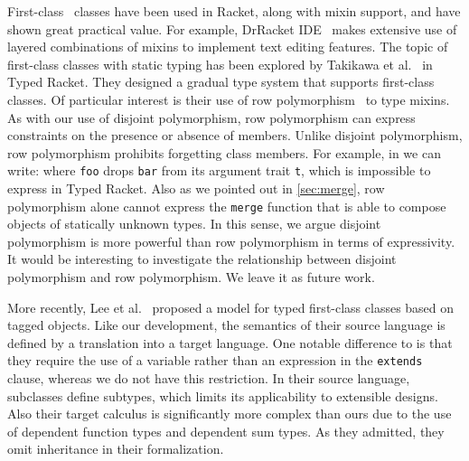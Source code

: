First-class~\citep{DBLP:conf/aplas/FlattFF06} classes have been used in
Racket, along with mixin support, and
have shown great practical value. For example, DrRacket
IDE~\citep{DBLP:journals/jfp/FindlerCFFKSF02} makes extensive use of layered
combinations of mixins to implement text editing features. The topic of
first-class classes with static typing has been explored by Takikawa et
al.~\citep{DBLP:conf/oopsla/TakikawaSDTF12} in Typed Racket. They designed a
gradual type system that supports first-class classes. Of particular interest is
their use of row polymorphism~\citep{wand1994type} to type mixins.
As with our use of disjoint polymorphism, row polymorphism can express
constraints on the presence or absence of members. Unlike disjoint polymorphism,
row polymorphism prohibits forgetting class members.
For example, in \namee we can write:
where \lstinline{foo} drops \lstinline{bar} from its argument trait \lstinline{t},
which is impossible to express in Typed Racket. Also as we pointed out in \cref{sec:merge}, row polymorphism
alone cannot express the \lstinline{merge} function that is able to compose objects of statically unknown types.
In this sense, we argue disjoint polymorphism is more powerful than row polymorphism in terms of expressivity.
It would be interesting to investigate the relationship between disjoint polymorphism and row polymorphism. We leave it
as future work.



More recently, Lee et al.~\citep{DBLP:conf/ecoop/LeeASP15} proposed a model for typed first-class
classes based on tagged objects. Like our development, the semantics
of their source language is defined by a translation into a target language.
One notable difference to \namee is that they require the use of a variable
rather than an expression in the \lstinline{extends} clause, whereas we do not
have this restriction. In their source language, subclasses define subtypes,
which limits its applicability to extensible designs. Also their target calculus is significantly more complex
than ours due to the use of dependent function types and dependent sum types. As
they admitted, they omit inheritance in their formalization.

